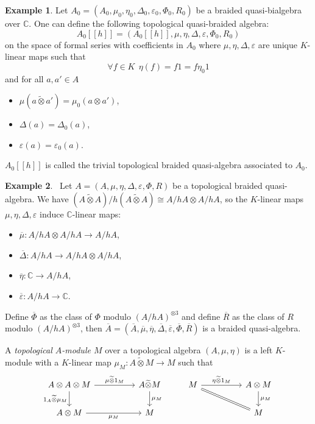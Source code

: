 \documentclass[8pt]{article}
\theoremstyle{definition}
\theoremstyle{definition}
\theoremstyle{definition}
\theoremstyle{definition}
\theoremstyle{definition}
\theoremstyle{definition}
\theoremstyle{definition}
\theoremstyle{definition}
\theoremstyle{definition}
\theoremstyle{definition}
\theoremstyle{definition}
\theoremstyle{definition}
\newtheorem{example}{Example}[section]
\theoremstyle{definition}
\theoremstyle{definition}
\theoremstyle{question}
\newcommand{\tildetimes}[0]{\widetilde{\otimes}}
\begin{document}
\begin{example}
  Let $A_0 = (A_0, \mu_0, \eta_0, \Delta_0, \varepsilon_0, \Phi_0, R_0)$ be a braided
  quasi-bialgebra over $\mathbb{C}$. One can define the following topological quasi-braided algebra:
  \[
  A_0 [[h]] = (A_0[[h]], \mu, \eta, \Delta, \varepsilon, \Phi_0, R_0)
  \]
  on the space of formal series with coefficients in $A_0$
  where $\mu, \eta, \Delta, \varepsilon$ are unique $K$-linear maps such that
  \[
  \forall f \in K \:\: \eta(f) = f1 = f\eta_0 1
  \]
  and for all $a, a' \in A$
  \begin{itemize}
    \item $\mu(a \tildetimes a') = \mu_0(a \otimes a')$,
    \item $\Delta(a) = \Delta_0(a)$,
    \item $\varepsilon(a) = \varepsilon_0(a)$.
  \end{itemize}
  $A_0 [[h]]$ is called the trivial topological braided quasi-algebra associated to $A_0$.
\end{example}
\begin{example}~\label{factor:quasi-algebra}
  Let $A = (A, \mu, \eta, \Delta, \varepsilon, \Phi, R)$ be a topological braided quasi-algebra.
  We have $(A \tildetimes A)/h(A \tildetimes A) \cong A/hA \otimes A/hA$, so the $K$-linear maps
  $\mu, \eta, \Delta, \varepsilon$ induce $\mathbb{C}$-linear maps:
  \begin{itemize}
    \item $\overline{\mu} : A/hA \otimes A/hA \to A/hA$,
    \item $\overline{\Delta} : A/hA \to A/hA \otimes A/hA$,
    \item $\overline{\eta} : \mathbb{C} \to A/hA$,
    \item $\overline{\varepsilon} : A/hA \to \mathbb{C}$.
  \end{itemize}
  Define $\overline{\Phi}$ as the class of $\Phi$ modulo $(A/hA)^{\otimes 3}$ and define $\overline{R}$
  as the class of $R$ modulo $(A/hA)^{\otimes 3}$, then 
  $\overline{A} = (\overline{A}, \overline{\mu}, \overline{\eta}, \overline{\Delta}, \overline{\varepsilon}, \overline{\Phi}, \overline{R})$
  is a braided quasi-algebra.
\end{example}

A \emph{topological $A$-module $M$} over a topological algebra $(A, \mu, \eta)$ is a left $K$-module with a $K$-linear map
$\mu_M : A \tildetimes M \to M$ such that
\[
\begin{tikzcd}
  A \otimes A \otimes M \ar[d, "1_A \tildetimes \mu_M"'] \ar[rr, "\mu \tildetimes 1_M"] && A \tildetimes M \ar[d, "\mu_M"] & M \ar[rr, "\eta \tildetimes 1_M"] \ar[drr, equal] && A \otimes M \ar[d, "\mu_M"] \\
  A \otimes M \ar[rr, "\mu_M"'] && M                                                                                       & && M
\end{tikzcd}
\]
\end{document}
